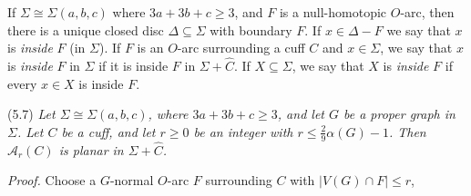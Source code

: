 If $\Sigma \cong \Sigma(a, b, c)$ where $3a + 3b + c \ge 3$, and $F$ is a null-homotopic $O$-arc, then there is a unique closed disc $\Delta \subseteq \Sigma$ with boundary $F$. If $x \in \Delta - F$ we say that $x$ is \textit{inside} $F$ (in $\Sigma$). If $F$ is an $O$-arc surrounding a cuff $C$ and $x \in \Sigma$, we say that $x$ is \textit{inside} $F$ in $\Sigma$ if it is inside $F$ in $\Sigma + \hat{C}$. If $X \subseteq \Sigma$, we say that $X$ is \textit{inside} $F$ if every $x \in X$ is inside $F$.

\stmt
(5.7) \textit{Let $\Sigma \cong \Sigma(a, b, c)$, where $3a + 3b + c \ge 3$, and let $G$ be a proper graph in $\Sigma$. Let $C$ be a cuff, and let $r \ge 0$ be an integer with $r \le \frac{2}{9}\alpha(G) - 1$. Then $\mathscr{A}_r(C)$ is planar in $\Sigma + \hat{C}$.}

\textit{Proof.} Choose a $G$-normal $O$-arc $F$ surrounding $C$ with $|V(G) \cap F| \le r$,
